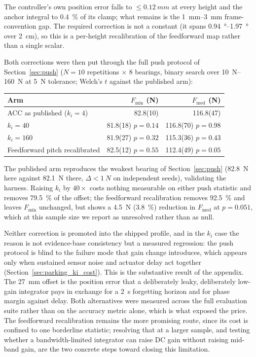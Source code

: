 \documentclass[a4paper,fleqn]{cas-dc}
\begin{document}
The controller's own position error falls to ${\leq}\SI{0.12}{mm}$ at every
height and the anchor integral to \SI{0.4}{\percent} of its clamp; what remains
is the \SIrange{1}{3}{mm} frame-convention gap. The required correction is not
a constant (it spans \SIrange{0.94}{1.97}{\degree} over \SI{2}{cm}), so this is
a per-height recalibration of the feedforward map rather than a single scalar.

Both corrections were then put through the full push protocol of
Section~\ref{sec:push} ($N{=}10$ repetitions $\times$ 8 bearings, binary search over
\SIrange{10}{160}{N} at \SI{5}{N} tolerance; Welch's $t$ against the published
arm):

\begin{center}\footnotesize\setlength{\tabcolsep}{4pt}
\begin{tabular}{lrr}
\hline
Arm & $F_{\min}$ (N) & $F_{\text{med}}$ (N) \\
\hline
ACC as published ($k_i{=}4$) & 82.8(10) & 116.8(47) \\
$k_i{=}40$ & 81.8(18)\,\,$p{=}0.14$ & 116.8(70)\,\,$p{=}0.98$ \\
$k_i{=}160$ & 81.9(27)\,\,$p{=}0.32$ & 115.3(36)\,\,$p{=}0.43$ \\
Feedforward pitch recalibrated & 82.5(12)\,\,$p{=}0.55$ & 112.4(49)\,\,$p{=}0.05$ \\
\hline
\end{tabular}
\end{center}

The published arm reproduces the weakest bearing of Section~\ref{sec:push}
(\SI{82.8}{N} here against \SI{82.1}{N} there, $\Delta{<}\SI{1}{N}$ on
independent seeds), validating the harness. Raising $k_i$ by $40{\times}$
costs nothing measurable on either push statistic and removes \SI{79.5}{\percent}
of the offset; the feedforward recalibration removes \SI{92.5}{\percent} and
leaves $F_{\min}$ unchanged, but shows a \SI{4.5}{N} (\SI{3.8}{\percent})
reduction in $F_{\text{med}}$ at $p{=}0.051$, which at this sample size we
report as unresolved rather than as null.

Neither correction is promoted into the shipped profile, and in the $k_i$ case
the reason is not evidence-base consistency but a measured regression: the
push protocol is blind to the failure mode that gain change introduces, which
appears only when sustained sensor noise and actuator delay act together
(Section~\ref{sec:parking_ki_cost}). This is the substantive result of the appendix.
The \SI{27}{mm} offset is the position error that a deliberately leaky,
deliberately low-gain integrator pays in exchange for a \SI{2}{s}
forgetting horizon and for phase margin against delay. Both alternatives were
measured across the full evaluation suite rather than on the accuracy metric
alone, which is what exposed the price. The feedforward recalibration remains
the more promising route, since its cost is confined to one borderline
statistic; resolving that at a larger sample, and testing whether a
bandwidth-limited integrator can raise DC gain without raising mid-band gain,
are the two concrete steps toward closing this limitation.
\end{document}
